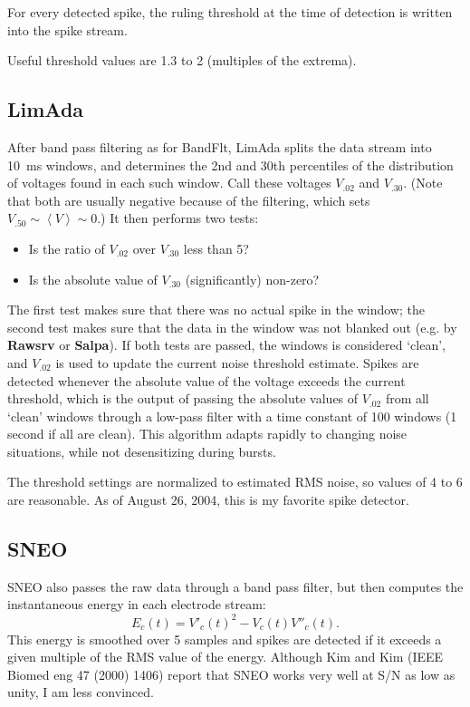 \documentclass[12pt,oneside]{book}
\def\prog#1{{\bf #1}}
\def\streamtype#1{{\sc #1}\xspace}
\def\raw{\streamtype{raw}}
\def\spike{\streamtype{spike}}
\begin{document}
For every detected spike, the ruling threshold at the time of
detection is written into the \spike stream.

Useful threshold values are 1.3 to 2 (multiples of the extrema).

\subsection{LimAda}

After band pass filtering as for BandFlt, LimAda splits the data
stream into 10~ms windows, and determines the 2nd and 30th percentiles
of the distribution of voltages found in each such window. Call these
voltages $V_{.02}$ and $V_{.30}$. (Note that both are usually
negative because of the filtering, which sets $V_{.50} \sim \left<V\right>
\sim 0$.) It then
performs two tests:
\begin{itemize}
\item Is the ratio of $V_{.02}$ over $V_{.30}$ less than 5?
\item Is the absolute value of $V_{.30}$ (significantly) non-zero?
\end{itemize}
The first test makes sure that there was no actual spike in the
window; the second test makes sure that the data in the window was not
blanked out (e.g. by \prog{Rawsrv} or \prog{Salpa}). If both tests are
passed, the windows is considered `clean', and $V_{.02}$ is used to
update the current noise threshold estimate. Spikes are detected
whenever the absolute value of the voltage exceeds the current
threshold, which is the output of passing the absolute values of
$V_{.02}$ from all `clean' windows through a low-pass filter with a
time constant of 100 windows (1 second if all are clean). This
algorithm adapts rapidly to changing noise situations, while not
desensitizing during bursts.

The threshold settings are normalized to estimated RMS noise, so
values of 4 to 6 are reasonable. As of August 26, 2004, this is my
favorite spike detector.

\subsection{SNEO}

SNEO also passes the \raw data through a
band pass filter, but then computes the instantaneous energy in each
electrode stream:
\[  E_c(t) = V'_c(t)^2 - V_c(t) V''_c(t). \]
This energy is smoothed over 5 samples and spikes are detected if it
exceeds a given multiple of the RMS value of the energy. Although Kim
and Kim (IEEE Biomed eng 47 (2000) 1406) report that SNEO works very
well at S/N as low as unity, I am less convinced.
\end{document}
